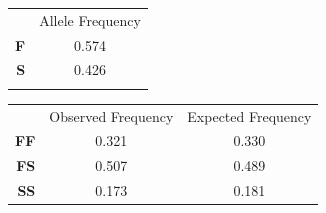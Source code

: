 \begin{solution}
\begin{minipage}{0.3\linewidth}
	\begin{tabular}{rc}
	&	Allele Frequency\\[3ex]
	\Large\textbf{F} & 0.574 \\[3ex]
	\Large\textbf{S} & 0.426 \\[3ex]
	\Large\null	 & \null\\
	\end{tabular}
\end{minipage}\hfill
\begin{minipage}{0.6\linewidth}
	\begin{tabular}{rcc}
		&	Observed Frequency		&	Expected Frequency\\[3ex]
		\large\textbf{FF} & 0.321 & 0.330 \\[3ex]
		\large\textbf{FS} & 0.507 & 0.489 \\[3ex]
		\large\textbf{SS} & 0.173 & 0.181 \\
	\end{tabular}
\end{minipage}
\end{solution}
\newpage